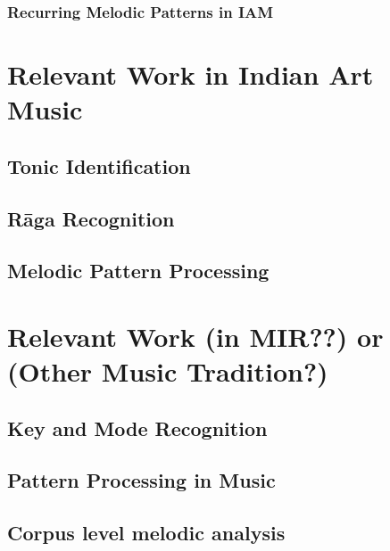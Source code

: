 \subsubsection{Recurring Melodic Patterns in IAM}

\section{Relevant Work in Indian Art Music}

\subsection{Tonic Identification}

\subsection{R\={a}ga Recognition}

\subsection{Melodic Pattern Processing}



\section{Relevant Work (in MIR??) or (Other Music Tradition?)}

\subsection{Key and Mode Recognition}

\subsection{Pattern Processing in Music}




\subsection{Corpus level melodic analysis}

